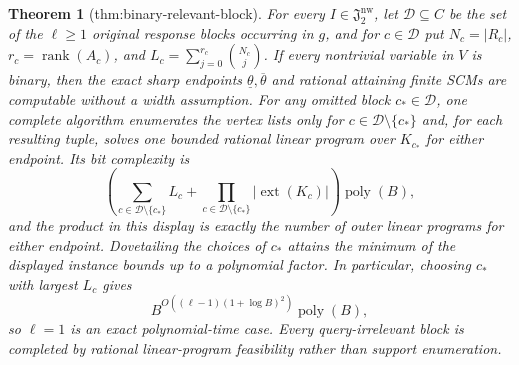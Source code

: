 \documentclass{article}
\newtheorem{theorem}{Theorem}
\begin{document}
\begin{theorem}[thm:binary-relevant-block]\label{thm:binary-relevant-block}
For every \(I\in\mathfrak J_2^{\mathrm{nw}}\), let \(\mathcal D\subseteq C\) be the set of the \(\ell\ge1\) original response blocks occurring in \(g\), and for \(c\in\mathcal D\) put \(N_c=|R_c|\), \(r_c=\operatorname{rank}(A_c)\), and \(L_c=\sum_{j=0}^{r_c}\binom{N_c}{j}\). If every nontrivial variable in \(V\) is binary, then the exact sharp endpoints \(\underline\theta,\overline\theta\) and rational attaining finite SCMs are computable without a width assumption. For any omitted block \(c_*\in\mathcal D\), one complete algorithm enumerates the vertex lists only for \(c\in\mathcal D\setminus\{c_*\}\) and, for each resulting tuple, solves one bounded rational linear program over \(K_{c_*}\) for either endpoint. Its bit complexity is
\[
\left(
 \sum_{c\in\mathcal D\setminus\{c_*\}}L_c
 +\prod_{c\in\mathcal D\setminus\{c_*\}}
       |\operatorname{ext}(K_c)|
\right)\operatorname{poly}(B),
\]
and the product in this display is exactly the number of outer linear programs for either endpoint. Dovetailing the choices of \(c_*\) attains the minimum of the displayed instance bounds up to a polynomial factor. In particular, choosing \(c_*\) with largest \(L_c\) gives
\[
B^{O((\ell-1)(1+\log B)^2)}\operatorname{poly}(B),
\]
so \(\ell=1\) is an exact polynomial-time case. Every query-irrelevant block is completed by rational linear-program feasibility rather than support enumeration.
\end{theorem}
\end{document}
